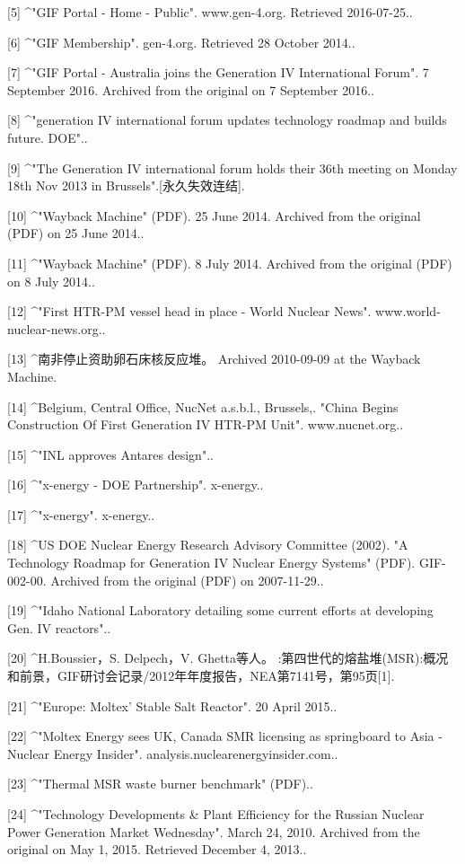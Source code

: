 [5]
^"GIF Portal - Home - Public". www.gen-4.org. Retrieved 2016-07-25..

[6]
^"GIF Membership". gen-4.org. Retrieved 28 October 2014..

[7]
^"GIF Portal - Australia joins the Generation IV International Forum". 7 September 2016. Archived from the original on 7 September 2016..

[8]
^"generation IV international forum updates technology roadmap and builds future. DOE"..

[9]
^"The Generation IV international forum holds their 36th meeting on Monday 18th Nov 2013 in Brussels".[永久失效连结].

[10]
^"Wayback Machine" (PDF). 25 June 2014. Archived from the original (PDF) on 25 June 2014..

[11]
^"Wayback Machine" (PDF). 8 July 2014. Archived from the original (PDF) on 8 July 2014..

[12]
^"First HTR-PM vessel head in place - World Nuclear News". www.world-nuclear-news.org..

[13]
^南非停止资助卵石床核反应堆。 Archived 2010-09-09 at the Wayback Machine.

[14]
^Belgium, Central Office, NucNet a.s.b.l., Brussels,. "China Begins Construction Of First Generation IV HTR-PM Unit". www.nucnet.org..

[15]
^"INL approves Antares design"..

[16]
^"x-energy - DOE Partnership". x-energy..

[17]
^"x-energy". x-energy..

[18]
^US DOE Nuclear Energy Research Advisory Committee (2002). "A Technology Roadmap for Generation IV Nuclear Energy Systems" (PDF). GIF-002-00. Archived from the original (PDF) on 2007-11-29..

[19]
^"Idaho National Laboratory detailing some current efforts at developing Gen. IV reactors"..

[20]
^H.Boussier，S. Delpech，V. Ghetta等人。 :第四世代的熔盐堆(MSR):概况和前景，GIF研讨会记录/2012年年度报告，NEA第7141号，第95页[1].

[21]
^"Europe: Moltex' Stable Salt Reactor". 20 April 2015..

[22]
^"Moltex Energy sees UK, Canada SMR licensing as springboard to Asia - Nuclear Energy Insider". analysis.nuclearenergyinsider.com..

[23]
^"Thermal MSR waste burner benchmark" (PDF)..

[24]
^"Technology Developments & Plant Efficiency for the Russian Nuclear Power Generation Market Wednesday". March 24, 2010. Archived from the original on May 1, 2015. Retrieved December 4, 2013..

